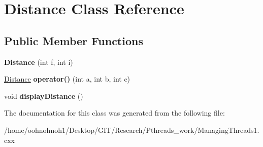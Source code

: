 \hypertarget{classDistance}{}\section{Distance Class Reference}
\label{classDistance}
\subsection*{Public Member Functions}
\begin{DoxyCompactItemize}
\item 
\mbox{\label{classDistance_a486dd7fdd83bca097941986f42ac3107}} 
{\bfseries Distance} (int f, int i)
\item 
\mbox{\label{classDistance_ad89badc4cbfaa5c27b0b2f8205ac2da8}} 
\hyperlink{classDistance}{Distance} {\bfseries operator()} (int a, int b, int c)
\item 
\mbox{\label{classDistance_a396afa4e4499b1e7f11c1c56d332adce}} 
void {\bfseries display\+Distance} ()
\end{DoxyCompactItemize}


The documentation for this class was generated from the following file\+:\begin{DoxyCompactItemize}
\item 
/home/oohnohnoh1/\+Desktop/\+G\+I\+T/\+Research/\+Pthreads\+\_\+work/Managing\+Threads1.\+cxx\end{DoxyCompactItemize}
